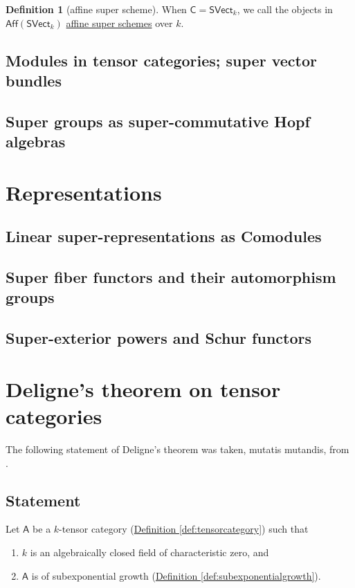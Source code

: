 \documentclass[a4paper]{report}
\newcommand{\defn}[1]{\ul{#1}}
\theoremstyle{definition}
\newtheorem{definition}{Definition}[section]
\theoremstyle{plain}
\theoremstyle{remark}
\begin{document}
\begin{definition}[affine super scheme]
  \label{def:affinesuperscheme}
  When $\mathsf{C} = \mathsf{SVect}_{k}$, we call the objects in $\mathsf{Aff}(\mathsf{SVect}_{k})$ \defn{affine super schemes} over $k$.
\end{definition}

\section{Modules in tensor categories; super vector bundles}

\section{Super groups as super-commutative Hopf algebras}


\chapter{Representations}
\section{Linear super-representations as Comodules}
\section{Super fiber functors and their automorphism groups}
\section{Super-exterior powers and Schur functors}

\chapter{Deligne's theorem on tensor categories}
The following statement of Deligne's theorem was taken, mutatis mutandis, from \cite{nlab-deligne-theorem}.

\section{Statement}
Let $\mathsf{A}$ be a $k$-tensor category (\hyperref[def:tensorcategory]{Definition \ref*{def:tensorcategory}}) such that
\begin{enumerate}
  \item $k$ is an algebraically closed field of characteristic zero, and

  \item $\mathsf{A}$ is of subexponential growth (\hyperref[def:subexponentialgrowth]{Definition \ref*{def:subexponentialgrowth}}).
\end{enumerate}
\end{document}
